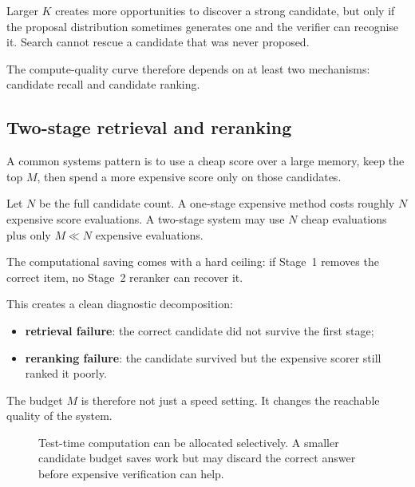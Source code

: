 Larger \(K\) creates more opportunities to discover a strong candidate, but only if the proposal distribution sometimes generates one and the verifier can recognise it. Search cannot rescue a candidate that was never proposed.

The compute-quality curve therefore depends on at least two mechanisms: candidate recall and candidate ranking.

\subsection{Two-stage retrieval and reranking}

A common systems pattern is to use a cheap score over a large memory, keep the top \(M\), then spend a more expensive score only on those candidates.

Let \(N\) be the full candidate count. A one-stage expensive method costs roughly \(N\) expensive score evaluations. A two-stage system may use \(N\) cheap evaluations plus only \(M\ll N\) expensive evaluations.

The computational saving comes with a hard ceiling: if Stage~1 removes the correct item, no Stage~2 reranker can recover it.

This creates a clean diagnostic decomposition:
\begin{itemize}[leftmargin=*]
  \item \textbf{retrieval failure}: the correct candidate did not survive the first stage;
  \item \textbf{reranking failure}: the candidate survived but the expensive scorer still ranked it poorly.
\end{itemize}

The budget \(M\) is therefore not just a speed setting. It changes the reachable quality of the system.

\begin{figure}[ht]
  \caption{Test-time computation can be allocated selectively. A smaller candidate budget saves work but may discard the correct answer before expensive verification can help.}
  \label{fig:week11-test-time-compute}
\end{figure}

